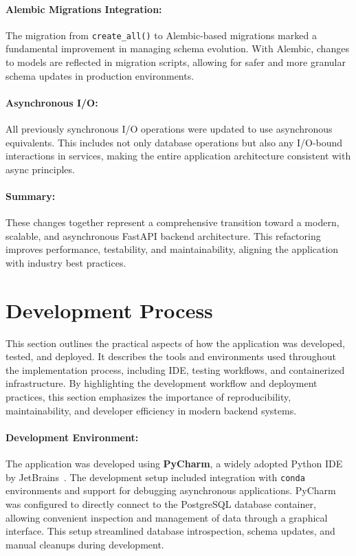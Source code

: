 \paragraph{Alembic Migrations Integration:}
The migration from \texttt{create\_all()} to Alembic-based migrations marked a fundamental improvement in managing schema evolution. With Alembic, changes to models are reflected in migration scripts, allowing for safer and more granular schema updates in production environments.

\paragraph{Asynchronous I/O:}
All previously synchronous I/O operations were updated to use asynchronous equivalents. This includes not only database operations but also any I/O-bound interactions in services, making the entire application architecture consistent with async principles.

\paragraph{Summary:}
These changes together represent a comprehensive transition toward a modern, scalable, and asynchronous FastAPI backend architecture. This refactoring improves performance, testability, and maintainability, aligning the application with industry best practices.

\section{Development Process}
This section outlines the practical aspects of how the application was developed, tested, and deployed. It describes the tools and environments used throughout the implementation process, including IDE, testing workflows, and containerized infrastructure. By highlighting the development workflow and deployment practices, this section emphasizes the importance of reproducibility, maintainability, and developer efficiency in modern backend systems.

\paragraph{Development Environment:}
The application was developed using \textbf{PyCharm}, a widely adopted Python IDE by JetBrains~\cite{PyCharm}. The development setup included integration with \texttt{conda} environments and support for debugging asynchronous applications. PyCharm was configured to directly connect to the PostgreSQL database container, allowing convenient inspection and management of data through a graphical interface. This setup streamlined database introspection, schema updates, and manual cleanups during development.


